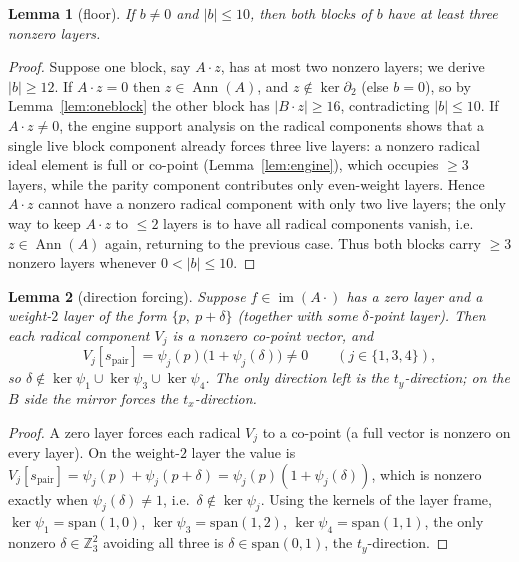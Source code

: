 \documentclass[11pt]{article}
\newcommand{\Z}{\mathbb{Z}}
\newcommand{\wt}[1]{\lvert #1\rvert}
\DeclareMathOperator{\Ann}{Ann}
\DeclareMathOperator{\img}{im}
\newcommand{\tx}{t_x}
\newcommand{\ty}{t_y}
\theoremstyle{plain}
\newtheorem{lemma}{Lemma}[section]
\theoremstyle{definition}
\theoremstyle{remark}
\begin{document}
\begin{lemma}[floor]\label{lem:floor-structure}
If $b\ne 0$ and $\wt{b}\le 10$, then \emph{both} blocks of $b$ have at least three nonzero
layers.
\end{lemma}

\begin{proof}
Suppose one block, say $A\cdot z$, has at most two nonzero layers; we derive
$\wt{b}\ge 12$. If $A\cdot z=0$ then $z\in\Ann(A)$, and $z\notin\ker\partial_2$ (else
$b=0$), so by Lemma~\ref{lem:oneblock} the other block has $\wt{B\cdot z}\ge 16$,
contradicting $\wt b\le 10$. If $A\cdot z\ne 0$, the engine support analysis on the
radical components shows that a single live block component already forces three live
layers: a nonzero radical ideal element is full or co-point (Lemma~\ref{lem:engine}),
which occupies $\ge 3$ layers, while the parity component contributes only even-weight
layers. Hence $A\cdot z$ cannot have a nonzero radical component with only two live
layers; the only way to keep $A\cdot z$ to $\le 2$ layers is to have all radical
components vanish, i.e.\ $z\in\Ann(A)$ again, returning to the previous case. Thus both
blocks carry $\ge 3$ nonzero layers whenever $0<\wt b\le 10$.
\end{proof}

\begin{lemma}[direction forcing]\label{lem:dirforce}
Suppose $f\in\img(A\cdot)$ has a zero layer and a weight-$2$ layer of the form
$\{p,\ p+\delta\}$ (together with some $\delta$-point layer). Then each radical component
$V_j$ is a nonzero co-point vector, and
\[
  V_j[s_{\mathrm{pair}}]=\psi_j(p)\bigl(1+\psi_j(\delta)\bigr)\ne 0
  \qquad(j\in\{1,3,4\}),
\]
so $\delta\notin\ker\psi_1\cup\ker\psi_3\cup\ker\psi_4$. The only direction left is the
$\ty$-direction; on the $B$ side the mirror forces the $\tx$-direction.
\end{lemma}

\begin{proof}
A zero layer forces each radical $V_j$ to a co-point (a full vector is nonzero on every
layer). On the weight-$2$ layer the value is $V_j[s_{\mathrm{pair}}]=\psi_j(p)+\psi_j(p+\delta)
=\psi_j(p)(1+\psi_j(\delta))$, which is nonzero exactly when $\psi_j(\delta)\ne 1$, i.e.\
$\delta\notin\ker\psi_j$. Using the kernels of the layer frame,
$\ker\psi_1=\mathrm{span}(1,0)$, $\ker\psi_3=\mathrm{span}(1,2)$,
$\ker\psi_4=\mathrm{span}(1,1)$, the only nonzero $\delta\in\Z_3^2$ avoiding all three is
$\delta\in\mathrm{span}(0,1)$, the $\ty$-direction.
\end{proof}
\end{document}
